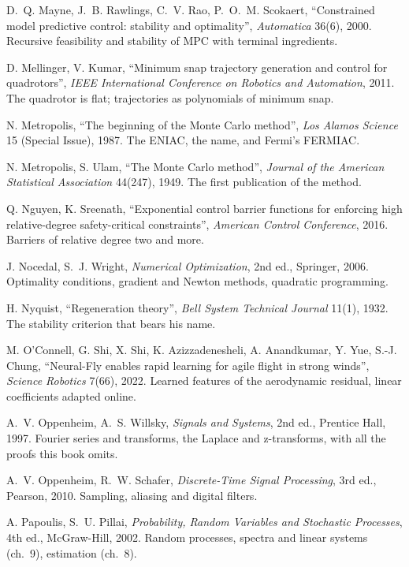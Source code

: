 \begin{description}[leftmargin=1.5em, itemindent=-1.5em, itemsep=5pt, font=\normalfont]
  \item[] D.~Q. Mayne, J.~B. Rawlings, C.~V. Rao, P.~O.~M. Scokaert, \enquote{Constrained model predictive control: stability and optimality}, \emph{Automatica} 36(6), 2000. Recursive feasibility and stability of MPC with terminal ingredients.
  \item[] D. Mellinger, V. Kumar, \enquote{Minimum snap trajectory generation and control for quadrotors}, \emph{IEEE International Conference on Robotics and Automation}, 2011. The quadrotor is flat; trajectories as polynomials of minimum snap.
  \item[] N. Metropolis, \enquote{The beginning of the Monte Carlo method}, \emph{Los Alamos Science} 15 (Special Issue), 1987. The ENIAC, the name, and Fermi's FERMIAC.
  \item[] N. Metropolis, S. Ulam, \enquote{The Monte Carlo method}, \emph{Journal of the American Statistical Association} 44(247), 1949. The first publication of the method.
  \item[] Q. Nguyen, K. Sreenath, \enquote{Exponential control barrier functions for enforcing high relative-degree safety-critical constraints}, \emph{American Control Conference}, 2016. Barriers of relative degree two and more.
  \item[] J. Nocedal, S.~J. Wright, \emph{Numerical Optimization}, 2nd ed., Springer, 2006. Optimality conditions, gradient and Newton methods, quadratic programming.
  \item[] H. Nyquist, \enquote{Regeneration theory}, \emph{Bell System Technical Journal} 11(1), 1932. The stability criterion that bears his name.
  \item[] M. O'Connell, G. Shi, X. Shi, K. Azizzadenesheli, A. Anandkumar, Y. Yue, S.-J. Chung, \enquote{Neural-Fly enables rapid learning for agile flight in strong winds}, \emph{Science Robotics} 7(66), 2022. Learned features of the aerodynamic residual, linear coefficients adapted online.
  \item[] A.~V. Oppenheim, A.~S. Willsky, \emph{Signals and Systems}, 2nd ed., Prentice Hall, 1997. Fourier series and transforms, the Laplace and z-transforms, with all the proofs this book omits.
  \item[] A.~V. Oppenheim, R.~W. Schafer, \emph{Discrete-Time Signal Processing}, 3rd ed., Pearson, 2010. Sampling, aliasing and digital filters.
  \item[] A. Papoulis, S.~U. Pillai, \emph{Probability, Random Variables and Stochastic Processes}, 4th ed., McGraw-Hill, 2002. Random processes, spectra and linear systems (ch.~9), estimation (ch.~8).

\end{description}
